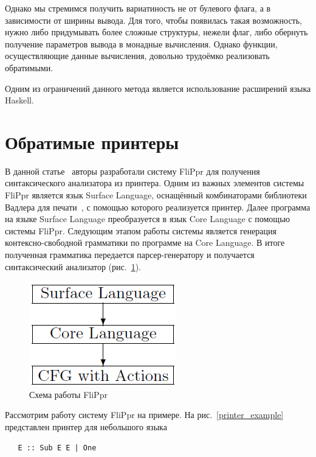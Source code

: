 Однако мы стремимся получить вариатиность не от булевого флага, а в зависимости от ширины вывода. 
Для того, чтобы появилась такая возможность, нужно либо придумывать более сложные структуры, 
нежели флаг, либо обернуть получение параметров вывода в монадные вычисления. Однако функции, 
осуществляющие данные вычисления, довольно трудоёмко реализовать обратимыми.

Одним из ограничений данного метода является использование расширений языка Haskell.

\section{Обратимые принтеры}

В данной статье~\cite{Matsuda} авторы разработали систему FliPpr для получения синтаксического 
анализатора из принтера. Одним из важных элементов системы FliPpr является язык Surface Language, 
оснащённый комбинаторами библиотеки Вадлера для печати~\cite{WadlerPrinter}, с помощью которого 
реализуется принтер. Далее программа на языке Surface Language преобразуется в язык Core Language 
с помощью системы FliPpr. Следующим этапом работы системы является генерация контексно-свободной 
грамматики по программе на Core Language. В итоге полученная грамматика передается 
парсер-генератору и получается синтаксический анализатор (рис.~\ref{FliPpr}).

\begin{figure}[h]
\centering
\includegraphics[scale=0.5]{Aliev/FliPprScheme.png}
\caption{Схема работы FliPpr}
\label{FliPpr}
\end{figure}

Рассмотрим работу систему FliPpr на примере. На рис.~\ref{printer_example} представлен принтер 
для небольшого языка 

\begin{verbatim}
   E :: Sub E E | One
\end{verbatim}

